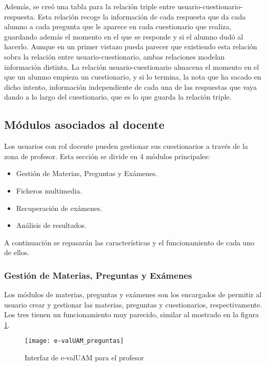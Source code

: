 Además, se creó una tabla para la relación triple entre usuario-cuestionario-respuesta. Esta relación recoge la información de cada respuesta que da cada alumno a cada pregunta que le aparece en cada cuestionario que realiza, guardando además el momento en el que se responde y si el alumno dudó al hacerlo. Aunque en un primer vistazo pueda parecer que existiendo esta relación sobra la relación entre usuario-cuestionario, ambas relaciones modelan información distinta. La relación usuario-cuestionario almacena el momento en el que un alumno empieza un cuestionario, y si lo termina, la nota que ha sacado en dicho intento, información independiente de cada una de las respuestas que vaya dando a lo largo del cuestionario, que es lo que guarda la relación triple.


\subsection{Módulos asociados al docente}

Los usuarios con rol docente pueden gestionar sus cuestionarios a través de la zona de profesor. Esta sección se divide en 4 módulos principales:

\begin{itemize}
	\item Gestión de Materias, Preguntas y Exámenes.
	\item Ficheros multimedia.
	\item Recuperación de exámenes.
	\item Análisis de resultados.
\end{itemize}

A continuación se repasarán las características y el funcionamiento de cada uno de ellos.

\subsubsection{Gestión de Materias, Preguntas y Exámenes}

Los módulos de materias, preguntas y exámenes son los encargados de permitir al usuario crear y gestionar las materias, preguntas y cuestionarios, respectivamente. Los tres tienen un funcionamiento muy parecido, similar al mostrado en la figura \ref{fig:e-valUAM interfaz profesor}.

\begin{figure}[htp!]
	\centering
	\texttt{[image: e-valUAM\_preguntas]}
	\caption{Interfaz de e-valUAM para el profesor}
	\label{fig:e-valUAM interfaz profesor}
\end{figure}

